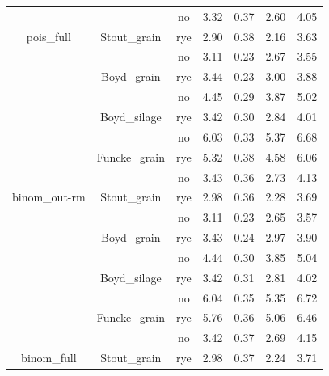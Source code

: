 \documentclass[
]{article}
\begin{document}
\begin{table}[H]
\begin{tabular}[t]{ccccccc}
\rowcolor{gray!6}   &  & no & 3.32 & 0.37 & 2.60 & 4.05\\

\multirow{-8}{*}{\centering\arraybackslash pois\_full} & \multirow{-2}{*}{\centering\arraybackslash Stout\_grain} & rye & 2.90 & 0.38 & 2.16 & 3.63\\
\cmidrule{1-7}
\rowcolor{gray!6}   &  & no & 3.11 & 0.23 & 2.67 & 3.55\\

 & \multirow{-2}{*}{\centering\arraybackslash Boyd\_grain} & rye & 3.44 & 0.23 & 3.00 & 3.88\\

\rowcolor{gray!6}   &  & no & 4.45 & 0.29 & 3.87 & 5.02\\

 & \multirow{-2}{*}{\centering\arraybackslash Boyd\_silage} & rye & 3.42 & 0.30 & 2.84 & 4.01\\

\rowcolor{gray!6}   &  & no & 6.03 & 0.33 & 5.37 & 6.68\\

 & \multirow{-2}{*}{\centering\arraybackslash Funcke\_grain} & rye & 5.32 & 0.38 & 4.58 & 6.06\\

\rowcolor{gray!6}   &  & no & 3.43 & 0.36 & 2.73 & 4.13\\

\multirow{-8}{*}{\centering\arraybackslash binom\_out-rm} & \multirow{-2}{*}{\centering\arraybackslash Stout\_grain} & rye & 2.98 & 0.36 & 2.28 & 3.69\\
\cmidrule{1-7}
\rowcolor{gray!6}   &  & no & 3.11 & 0.23 & 2.65 & 3.57\\

 & \multirow{-2}{*}{\centering\arraybackslash Boyd\_grain} & rye & 3.43 & 0.24 & 2.97 & 3.90\\

\rowcolor{gray!6}   &  & no & 4.44 & 0.30 & 3.85 & 5.04\\

 & \multirow{-2}{*}{\centering\arraybackslash Boyd\_silage} & rye & 3.42 & 0.31 & 2.81 & 4.02\\

\rowcolor{gray!6}   &  & no & 6.04 & 0.35 & 5.35 & 6.72\\

 & \multirow{-2}{*}{\centering\arraybackslash Funcke\_grain} & rye & 5.76 & 0.36 & 5.06 & 6.46\\

\rowcolor{gray!6}   &  & no & 3.42 & 0.37 & 2.69 & 4.15\\

\multirow{-8}{*}{\centering\arraybackslash binom\_full} & \multirow{-2}{*}{\centering\arraybackslash Stout\_grain} & rye & 2.98 & 0.37 & 2.24 & 3.71\\
\bottomrule
\end{tabular}
\end{table}
\end{document}
